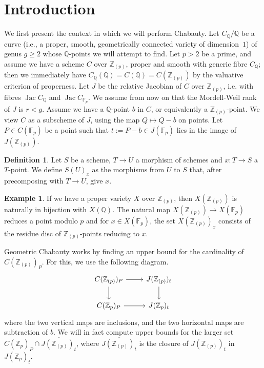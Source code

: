 \documentclass[12pt]{article}
\newcommand{\Z}{\mathbb{Z}}
\newcommand{\Q}{\mathbb{Q}}
\newcommand{\F}{\mathbb{F}}
\DeclareMathOperator{\Jac}{Jac}
\theoremstyle{plain}
\theoremstyle{definition}
\newtheorem{defn}[thm]{Definition} %
\newtheorem{exmp}[thm]{Example} %
\theoremstyle{remark}
\begin{document}
\section{Introduction}
We first present the context in which we will perform Chabauty. Let $C_{\Q}/\Q$ be a curve (i.e., a proper, smooth, geometrically connected variety of dimension~$1$) of genus $g \geq 2$ whose $\Q$-points we will attempt to find. Let $p>2$ be a prime, and assume we have a scheme $C$ over $\Z_{(p)}$, proper and smooth with generic fibre $C_{\Q}$; then we immediately have $C_\Q(\Q) = C(\Q) = C(\Z_{(p)})$ by the valuative criterion of properness. Let $J$ be the relative Jacobian of $C$ over $\Z_{(p)}$, i.e. with fibres $\Jac C_\Q$ and $\Jac C_{\F_p}$. We assume from now on that the Mordell-Weil rank of $J$ is $r < g$. Assume we have a $\Q$-point $b$ in $C$, or equivalently a $\Z_{(p)}$-point. We view $C$ as a subscheme of $J$, using the map $Q \mapsto Q - b$ on points. Let $P \in C(\F_p)$ be a point such that $t := P - b \in J(\F_p)$ lies in the image of $J(\Z_{(p)})$.

\begin{defn}
Let $S$ be a scheme, $T \to U$ a morphism of schemes and $x : T \to S$ a $T$-point. We define $S(U)_x$ as the morphisms from $U$ to $S$ that, after precomposing with $T \to U$, give $x$.
\end{defn}
\begin{exmp}
If we have a proper variety $X$ over $\Z_{(p)}$, then $X(\Z_{(p)})$ is naturally in bijection with $X(\Q)$. The natural map $X(\Z_{(p)}) \to X(\F_p)$ reduces a point modulo $p$ and for $x \in X(\F_p)$, the set $X(\Z_{(p)})_x$ consists of the residue disc of $\Z_{(p)}$-points reducing to $x$.
\end{exmp}

Geometric Chabauty works by finding an upper bound for the cardinality of $C(\Z_{(p)})_P$. For this, we use the following diagram.
\[
\begin{tikzcd}
C(\Z_{(p)})_P \arrow[d] \arrow[r] & J(\Z_{(p)})_t \arrow[d] \\
C(\Z_p)_P \arrow[r]              & J(\Z_p)_t        
\end{tikzcd}
\]
where the two vertical maps are inclusions, and the two horizontal maps are subtraction of $b$. We will in fact compute upper bounds for the larger set $C(\Z_p)_P \cap \overline{J(\Z_{(p)})_t}$, where $\overline{J(\Z_{(p)})_t}$ is the closure of $J(\Z_{(p)})_t$ in $J(\Z_p)_t$. 
\end{document}
